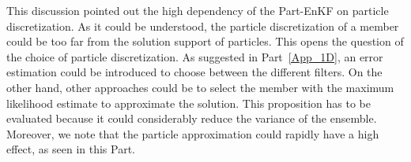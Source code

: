 This discussion pointed out the high dependency of the Part-EnKF on particle discretization. As it could be understood, the particle discretization of a member could be too far from the solution support of particles. This opens the question of the choice of particle discretization. As suggested in Part~\ref{App_1D}, an error estimation could be introduced to choose between the different filters. On the other hand, other approaches could be to select the member with the maximum likelihood estimate to approximate the solution. This proposition has to be evaluated because it could considerably reduce the variance of the ensemble. Moreover, we note that the particle approximation could rapidly have a high effect, as seen in this Part.
\newpage
